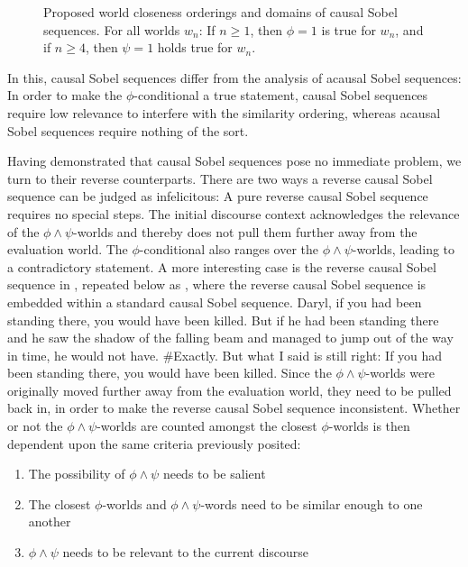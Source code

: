 \begin{figure}[!htb]

\caption{Proposed world closeness orderings and domains of causal Sobel sequences. For all worlds $w_n$: If $n\geqslant1$, then $\phi=1$ is true for $w_n$, and if $n\geqslant 4$, then $\psi=1$ holds true for $w_n$.}
\end{figure}
In this, causal Sobel sequences differ from the analysis of acausal Sobel sequences: In order to make the $\phi$-conditional a true statement, causal Sobel sequences require low relevance to interfere with the similarity ordering, whereas acausal Sobel sequences require nothing of the sort.

Having demonstrated that causal Sobel sequences pose no immediate problem, we turn to their reverse counterparts. There are two ways a reverse causal Sobel sequence can be judged as infelicitous: A pure reverse causal Sobel sequence requires no special steps. The initial discourse context acknowledges the relevance of the $\phi\land\psi$-worlds and thereby does not pull them further away from the evaluation world. The $\phi$-conditional also ranges over the $\phi\land\psi$-worlds, leading to a contradictory statement. A more interesting case is the reverse causal Sobel sequence in , repeated below as , where the reverse causal Sobel sequence is embedded within a standard causal Sobel sequence. 
\pex{}
			\a	{}Daryl, if you had been standing there, you would have been killed.
			\a	{}But if he had been standing there and he saw the shadow of the falling beam and managed to jump out of the way in time, he would not have.
			\a	{}\#Exactly. But what I said is still right:  If you had been
standing there, you would have been killed.\hfill\parencite[adapted from][p. 153f]{Klecha2014}
\xe
Since the $\phi\land\psi$-worlds were originally moved further away from the evaluation world, they need to be pulled back in, in order to make the reverse causal Sobel sequence inconsistent. Whether or not the $\phi\land\psi$-worlds are counted amongst the closest $\phi$-worlds is then dependent upon the same criteria previously posited: 
\begin{enumerate}
    \item The possibility of $\phi\land\psi$ needs to be salient
    \item The closest $\phi$-worlds and $\phi\land\psi$-words need to be similar enough to one another
    \item $\phi\land\psi$ needs to be relevant to the current discourse 
\end{enumerate}
